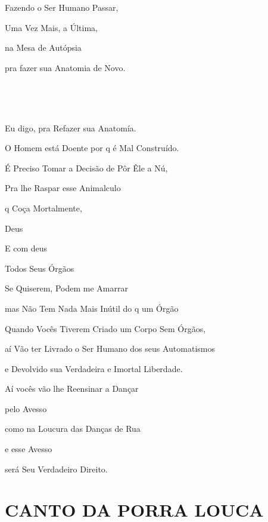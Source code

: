 
Fazendo o Ser Humano Passar,

Uma Vez Mais, a Última,

na Mesa de Autópsia

pra fazer sua Anatomia de Novo.

~


~

Eu digo, pra Refazer sua Anatomía.

O Homem está Doente por q é Mal Construído.

É Preciso Tomar a Decisão de Pôr Êle a Nú,

Pra lhe Raspar esse Animalculo

q Coça Mortalmente,

Deus

E com deus

Todos Seus Órgãos

Se Quiserem, Podem me Amarrar

mas Não Tem Nada Mais Inútil do q um Órgão


Quando Vocês Tiverem Criado um Corpo Sem Órgãos,

aí Vão ter Livrado o Ser Humano dos seus Automatismos

e Devolvido sua Verdadeira e Imortal Liberdade.

Aí vocês vão lhe Reensinar a Dançar

pelo Avesso

como na Loucura das Danças de Rua

e esse Avesso

será Seu Verdadeiro Direito.


\section*{CANTO DA PORRA LOUCA}

